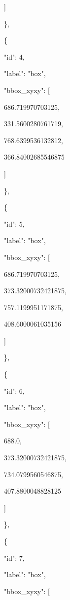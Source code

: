 \documentclass[10pt,a4paper]{article}
\begin{document}
      ]\par
    \},\allowbreak{}\par
    \{\par
      "id":\allowbreak{} 4,\allowbreak{}\par
      "label":\allowbreak{} "box",\allowbreak{}\par
      "bbox\_xyxy":\allowbreak{} [\par
        686.719970703125,\allowbreak{}\par
        331.5600280761719,\allowbreak{}\par
        768.6399536132812,\allowbreak{}\par
        366.84002685546875\par
      ]\par
    \},\allowbreak{}\par
    \{\par
      "id":\allowbreak{} 5,\allowbreak{}\par
      "label":\allowbreak{} "box",\allowbreak{}\par
      "bbox\_xyxy":\allowbreak{} [\par
        686.719970703125,\allowbreak{}\par
        373.32000732421875,\allowbreak{}\par
        757.1199951171875,\allowbreak{}\par
        408.6000061035156\par
      ]\par
    \},\allowbreak{}\par
    \{\par
      "id":\allowbreak{} 6,\allowbreak{}\par
      "label":\allowbreak{} "box",\allowbreak{}\par
      "bbox\_xyxy":\allowbreak{} [\par
        688.0,\allowbreak{}\par
        373.32000732421875,\allowbreak{}\par
        734.0799560546875,\allowbreak{}\par
        407.8800048828125\par
      ]\par
    \},\allowbreak{}\par
    \{\par
      "id":\allowbreak{} 7,\allowbreak{}\par
      "label":\allowbreak{} "box",\allowbreak{}\par
      "bbox\_xyxy":\allowbreak{} [\par
\end{document}
